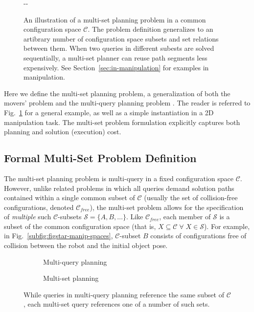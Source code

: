 \documentclass{report}
\newlength{\offsetpage}
\newenvironment{widepage}
   {\begin{adjustwidth}{-\offsetpage}{-\offsetpage}%
    \addtolength{\textwidth}{2\offsetpage}}%
{\end{adjustwidth}}
\begin{document}
\begin{figure}
\begin{widepage}
\caption{An illustration of a multi-set planning
  problem in a common configuration space $\mathcal{C}$.
  The problem definition generalizes to an artibrary number of
  configuration space subsets and set relations between them.
  When two queries in different subests are solved sequentially,
  a multi-set planner can reuse path segments less expensively.
  See Section~\ref{sec:in-manipulation} for examples in
  manipulation.}
\label{fig:multi-set}
\end{widepage}
\end{figure}

Here we define the multi-set planning problem,
a generalization of both the movers' problem
and the multi-query planning problem
\cite{kavrakietal1996prm}.
The reader is referred to
Fig.~\ref{fig:multi-set}
for a general example,
as well as a simple instantiation in a 2D manipulation task.
The multi-set problem formulation
explicitly captures both planning and
solution (execution) cost.

\subsection{Formal Multi-Set Problem Definition}
\label{subsec:problem-definition}

The multi-set planning problem is multi-query in
a fixed configuration space $\mathcal{C}$.
However, unlike related problems in which all
queries demand solution paths contained within a single common subset of
$\mathcal{C}$
(usually the set of collision-free configurations, denoted
$\mathcal{C}_{free}$),
the multi-set problem allows for the specification of
\emph{multiple} such $\mathcal{C}$-subsets
$\mathcal{S} = \{ A, B, \dots \}$.
Like $\mathcal{C}_{free}$,
each member of $\mathcal{S}$
is a subset of the common configuration space
(that is,
$X \subseteq \mathcal{C} \;\forall\; X \in \mathcal{S}$).
For example, in Fig.~\ref{subfig:figstar-manip-spaces},
$\mathcal{C}$-subset $B$
consists of configurations
free of collision between the robot and
the initial object pose.

\begin{figure}
\centering
\begin{subfigure}[t]{0.45\linewidth}
\centering

\caption{Multi-query planning}
\end{subfigure}%
\quad\quad%
\begin{subfigure}[t]{0.45\linewidth}
\centering

\caption{Multi-set planning}
\end{subfigure}
\caption{While queries in multi-query planning reference
  the same subset of $\mathcal{C}$,
  each multi-set query references one of a number of such sets.}
\label{fig:query-to-subset}
\end{figure}
\end{document}
